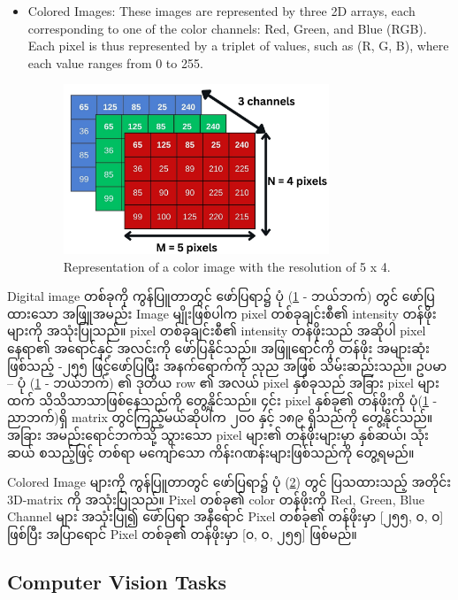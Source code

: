 \begin{itemize}
\begin{figure}[H]
    \label{fig:gray_img}
\end{figure}
  \item Colored Images: These images are represented by three 2D arrays, each corresponding to one of the color channels: Red, Green, and Blue (RGB). Each pixel is thus represented by a triplet of values, such as (R, G, B), where each value ranges from 0 to 255. 
      \begin{figure}[h]%
        \centering
        \includegraphics[width=0.75\textwidth]{imgs/colorImg.jpg}
        \caption{Representation of a color image with the resolution of 5 x 4. }\label{fig:colorImg}
        \end{figure}
\end{itemize}

Digital image တစ်ခုကို ကွန်ပြူတာတွင် ဖော်ပြရာ၌ ပုံ (\ref{fig:gray_img} - ဘယ်ဘက်) တွင် ဖော်ပြထားသော အဖြူအမည်း Image မျိုးဖြစ်ပါက pixel တစ်ခုချင်းစီ၏ intensity တန်ဖိုးများကို အသုံးပြုသည်။ pixel တစ်ခုချင်းစီ၏ intensity တန်ဖိုးသည် အဆိုပါ pixel နေရာ၏ အရောင်နှင့် အလင်းကို ဖော်ပြနိုင်သည်။ အဖြူရောင်ကို တန်ဖိုး အများဆုံး ဖြစ်သည့် -၂၅၅ ဖြင့်ဖော်ပြပြီး အနက်ရောက်ကို သုည အဖြစ် သိမ်းဆည်းသည်။ ဥပမာ -- ပုံ (\ref{fig:gray_img} - ဘယ်ဘက်) ၏ ဒုတိယ row ၏ အလယ် pixel နှစ်ခုသည် အခြား   pixel များထက် သိသိသာသာဖြစ်နေသည်ကို တွေ့နိုင်သည်။ ၄င်း  pixel နှစ်ခု၏ တန်ဖိုးကို  ပုံ(\ref{fig:gray_img} - ညာဘက်)ရှိ  matrix တွင်ကြည့်မယ်ဆိုပါက ၂၀၀ နှင့် ၁၈၉ ရှိသည်ကို တွေ့နိုင်သည်။ အခြား အမည်းရောင်ဘက်သို့ သွားသော pixel များ၏ တန်ဖိုးများမှာ နှစ်ဆယ်၊ သုံးဆယ် စသည့်ဖြင့် တစ်ရာ မကျော်သော ကိန်းဂဏန်းများဖြစ်သည်ကို တွေ့ရမည်။ 

Colored Image များကို ကွန်ပြူတာတွင် ဖော်ပြရာ၌ ပုံ (\ref{fig:colorImg}) တွင် ပြသထားသည့် အတိုင်း 3D-matrix ကို အသုံးပြုသည်။ Pixel တစ်ခု၏ color တန်ဖိုးကို Red, Green, Blue Channel များ အသုံးပြု၍ ဖော်ပြရာ အနီရောင် Pixel တစ်ခု၏ တန်ဖိုးမှာ [၂၅၅, ၀, ၀] ဖြစ်ပြီး အပြာရောင် Pixel တစ်ခု၏ တန်ဖိုးမှာ [၀, ၀, ၂၅၅] ဖြစ်မည်။ 

\subsection{Computer Vision Tasks}

